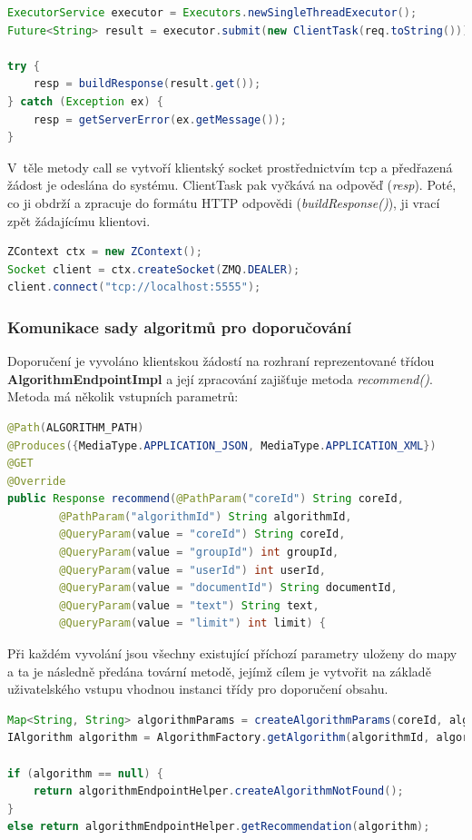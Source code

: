 \documentclass[thesis=M,czech]{FITthesis}[2014/05/07]
\begin{document}
\begin{lstlisting}[language=java]
ExecutorService executor = Executors.newSingleThreadExecutor();
Future<String> result = executor.submit(new ClientTask(req.toString()));

try {
    resp = buildResponse(result.get());
} catch (Exception ex) {
    resp = getServerError(ex.getMessage());
}
\end{lstlisting}

V~těle metody call se vytvoří klientský socket prostřednictvím tcp a předřazená žádost je odeslána do systému. ClientTask pak vyčkává na odpověď (\emph{resp}). Poté, co ji obdrží a zpracuje do formátu HTTP odpovědi (\emph{buildResponse()}), ji vrací zpět žádajícímu klientovi. 

\begin{lstlisting}[language=java]
ZContext ctx = new ZContext();
Socket client = ctx.createSocket(ZMQ.DEALER);
client.connect("tcp://localhost:5555");
\end{lstlisting}

\subsubsection{Komunikace sady algoritmů pro doporučování}
\label{sec:algcom}
Doporučení je vyvoláno klientskou žádostí na rozhraní reprezentované třídou \textbf{AlgorithmEndpointImpl} a její zpracování zajišťuje metoda \emph{recommend()}. Metoda má několik vstupních parametrů:

\begin{lstlisting}[language=java]
@Path(ALGORITHM_PATH)
@Produces({MediaType.APPLICATION_JSON, MediaType.APPLICATION_XML})
@GET
@Override
public Response recommend(@PathParam("coreId") String coreId,
        @PathParam("algorithmId") String algorithmId,
        @QueryParam(value = "coreId") String coreId,
        @QueryParam(value = "groupId") int groupId,
        @QueryParam(value = "userId") int userId,
        @QueryParam(value = "documentId") String documentId,
        @QueryParam(value = "text") String text,
        @QueryParam(value = "limit") int limit) {
\end{lstlisting}

Při každém vyvolání jsou všechny existující příchozí parametry uloženy do mapy a ta je následně předána tovární metodě, jejímž cílem je vytvořit na základě uživatelského vstupu vhodnou instanci třídy pro doporučení obsahu.

\begin{lstlisting}[language=java]
Map<String, String> algorithmParams = createAlgorithmParams(coreId, algorithmId, groupId, userId, documentId, text, limit);
IAlgorithm algorithm = AlgorithmFactory.getAlgorithm(algorithmId, algorithmParams);

if (algorithm == null) {
    return algorithmEndpointHelper.createAlgorithmNotFound();
}
else return algorithmEndpointHelper.getRecommendation(algorithm);
\end{lstlisting}
\end{document}
